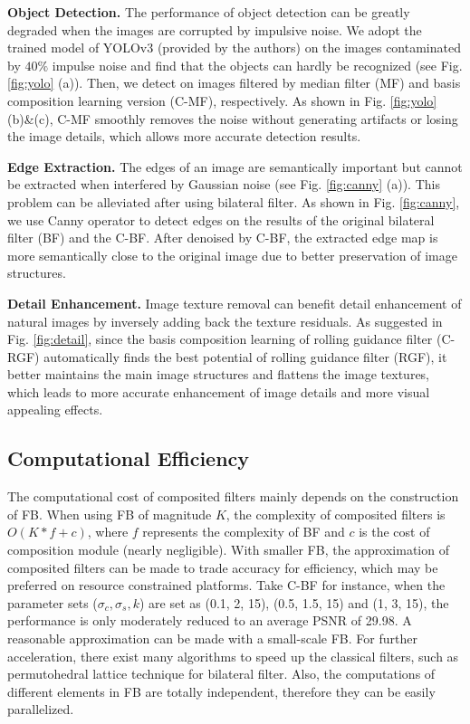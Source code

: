\documentclass[twocolumn]{svjour3}          %
\begin{document}
\textbf{Object Detection.}
 The performance of object detection can be greatly degraded when the images are corrupted by impulsive noise. We adopt the trained model of YOLOv3 \cite{redmon2018yolov3} (provided by the authors) on the images contaminated by $40\%$ impulse noise and find that the objects can hardly be recognized (see Fig. \ref{fig:yolo} (a)). Then, we detect on images filtered by median filter (MF) and basis composition learning version (C-MF), respectively. As shown in Fig. \ref{fig:yolo} (b)\&(c), C-MF smoothly removes the noise without generating artifacts or losing the image details, which allows more accurate detection results. 

 \textbf{Edge Extraction.}
 The edges of an image are semantically important but cannot be extracted when interfered by Gaussian noise (see Fig. \ref{fig:canny} (a)). This problem can be alleviated after using bilateral filter. As shown in Fig. \ref{fig:canny}, we use Canny operator to detect edges on the results of the original bilateral filter (BF) and the C-BF. After denoised by C-BF, the extracted edge map is more semantically close to the original image due to better preservation of image structures.

 \textbf{Detail Enhancement.}
 Image texture removal can benefit detail enhancement of natural images by inversely adding back the texture residuals. As suggested in Fig. \ref{fig:detail}, since the basis composition learning of rolling guidance filter (C-RGF) automatically finds the best potential of rolling guidance filter (RGF), it better maintains the main image structures and flattens the image textures, which leads to more accurate enhancement of image details and more visual appealing effects.


\subsection{Computational Efficiency} \label{sec:4.3}
The computational cost of composited filters mainly depends on the construction of FB. When using FB of magnitude $K$, the complexity of composited filters is $O(K*f+c)$, where $f$ represents the complexity of BF and $c$ is the cost of composition module (nearly negligible). With smaller FB, the approximation of composited filters can be made to trade accuracy for efficiency, which may be preferred on resource constrained platforms. Take C-BF for instance, when the parameter sets ($\sigma_{c},\sigma_{s},k$) are set as (0.1, 2, 15), (0.5, 1.5, 15) and (1, 3, 15), the performance is only moderately reduced to an average PSNR of 29.98. A reasonable approximation can be made with a small-scale FB. For further acceleration, there exist many algorithms to speed up the classical filters, such as permutohedral lattice technique \cite{adams2010fast} for bilateral filter. Also, the computations of different elements in FB are totally independent, therefore they can be easily parallelized.
\end{document}
